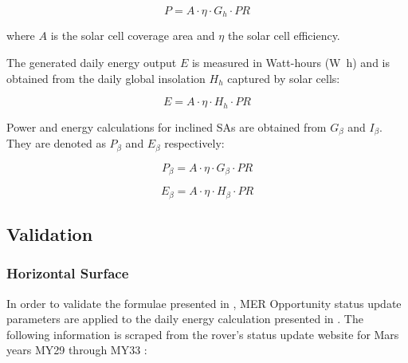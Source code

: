 \begin{equation}
  \label{eq:SA_power}
  P = A \cdot \eta \cdot G_{h} \cdot PR
\end{equation}

where $A$ is the solar cell coverage area and $\eta$ the solar cell efficiency.

The generated daily energy output $E$ is measured in Watt-hours (\si{\watt\hour}) and is obtained from the daily global insolation $H_{h}$ captured by solar cells:

\begin{equation}
  \label{eq:SA_energy}
  E = A \cdot \eta \cdot H_{h} \cdot PR
\end{equation}

Power and energy calculations for inclined \acp{SA} are obtained from $G_{\beta}$ and $I_{\beta}$. They are denoted as $P_{\beta}$ and $E_{\beta}$ respectively:

\begin{equation}
  \label{eq:SA_slope_power}
  P_{\beta} = A \cdot \eta \cdot G_{\beta} \cdot PR
\end{equation}


\begin{equation}
  \label{eq:SA_slope_energy}
  E_{\beta} = A \cdot \eta \cdot H_{\beta} \cdot PR
\end{equation}

\subsection{Validation}
\label{sec:PowerAndEnergyPredictions:Validation}


\subsubsection{Horizontal Surface}
\label{sec:PowerAndEnergyPredictions:Validation:HorizontalSurface}

In order to validate the formulae presented in , \ac{MER} Opportunity status update parameters are applied to the daily energy calculation presented in . The following information is scraped from the rover's status update website for Mars years \ac{MY}29 through \ac{MY}33  :

